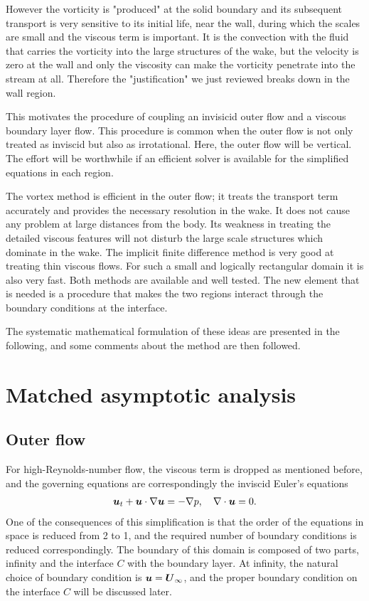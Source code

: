 However the vorticity is "produced" at the solid boundary and its subsequent transport is very sensitive to its initial life, near the wall, during which the scales are small and the viscous term is important.
It is the convection with the fluid that carries the vorticity into the large structures of the wake, but the velocity is zero at the wall and only the viscosity can make the vorticity penetrate into the stream at all.
Therefore the "justification" we just reviewed breaks down in the wall region.

This motivates the procedure of coupling an invisicid outer flow and a viscous boundary layer flow.
This procedure is common when the outer flow is not only treated as inviscid but also as irrotational.
Here, the outer flow will be vertical.
The effort will be worthwhile if an efficient solver is available for the simplified equations in each region.

The vortex method is efficient in the outer flow; it treats the transport term accurately and provides the necessary resolution in the wake.
It does not cause any problem at large distances from the body.
Its weakness in treating the detailed viscous features will not disturb the large scale structures which dominate in the wake.
The implicit finite difference method is very good at treating thin viscous flows.
For such a small and logically rectangular domain it is also very fast.
Both methods are available and well tested.
The new element that is needed is a procedure that makes the two regions interact through the boundary conditions at the interface.

The systematic mathematical formulation of these ideas are presented in the following, and some comments about the method are then followed.


\section{Matched asymptotic analysis}


\subsection{Outer flow}

For high-Reynolds-number flow, the viscous term is dropped as mentioned before, and the governing equations are correspondingly the inviscid Euler's equations
\begin{align}
\boldsymbol{u}_t + \boldsymbol{u} \cdot \nabla \boldsymbol{u}  =  -\nabla p,  \quad
\nabla \cdot \boldsymbol{u}  =  0.
\label{eqn:Euler}
\end{align}
One of the consequences of this simplification is that the order of the equations in space is reduced from 2 to 1, and the required number of boundary conditions is reduced correspondingly.
The boundary of this domain is composed of two parts, infinity and the interface $C$ with the boundary layer. 
At infinity, the natural choice of boundary condition is $\boldsymbol{u} = \boldsymbol{U}_{\infty}$, and the proper boundary condition on the interface $C$ will be discussed later.

